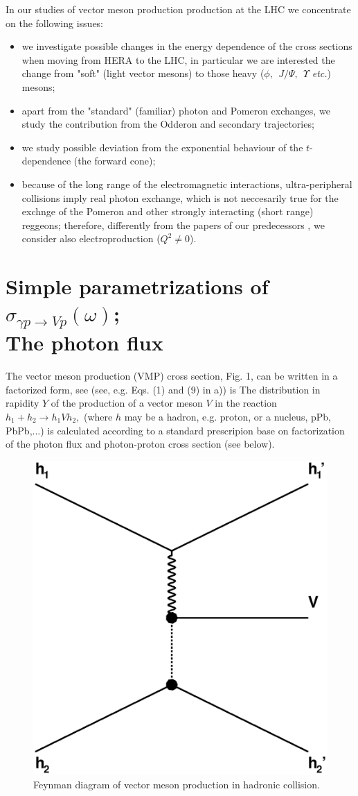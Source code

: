 \documentclass[12pt]{article}
\begin{document}
In our studies of vector meson production production at the LHC we concentrate on the following issues:
\begin{itemize}

\item we investigate possible changes in the energy dependence of the cross sections when moving from HERA to the LHC, in particular we are interested the change from "soft" (light vector mesons) to those heavy ($\phi,\ \ J/\Psi,\ \ \Upsilon$ {\it etc.}) mesons;

\item apart from the "standard" (familiar) photon and Pomeron exchanges, we study the
contribution from the Odderon and secondary trajectories;

\item we study possible deviation from the exponential behaviour of the $t$-dependence
(the forward cone);

\item because of the long range of the electromagnetic interactions, ultra-peripheral collisions imply real photon exchange, which is not neccesarily true for the exchnge of the Pomeron and other strongly interacting (short range) reggeons;  therefore, differently from the papers of our predecessors \cite{Schafer, Brazil, Ryskin, Motyka, Szczurek}, we consider also electroproduction ($Q^2\neq 0$).

\end{itemize}

\section{Simple parametrizations of $\sigma_{\gamma p\rightarrow Vp}(\omega)$;\\
The photon flux}\label{simple}

The vector meson production (VMP) cross section, Fig. 1, can be written in a factorized form, see \cite{Brazil, Review} 
(see, e.g. Eqs. (1) and (9) in \cite{Brazil}a)) is
The distribution in rapidity $Y$ of the production of a vector meson $V$ in the reaction $h_1+h_2\rightarrow h_1Vh_2,$ (where $h$ may be a hadron, e.g. proton, or a nucleus, pPb, PbPb,...) is calculated according to a standard prescripion base on factorization of the photon flux and photon-proton cross section (see below).

\begin{figure}[!h]
\centering
 \includegraphics[width=.4\textwidth]{figures/exclusive_vmp.eps}
 \caption{Feynman diagram of vector meson production in hadronic collision.}
 \label{fig:vmp_feynman}
\end{figure}
\end{document}
